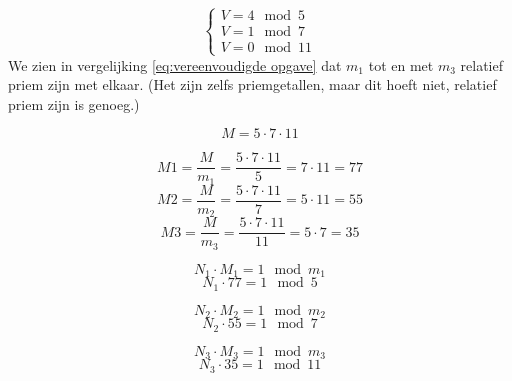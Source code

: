 \documentclass[12pt]{article}
\begin{document}
    \begin{equation} \label{eq:vereenvoudigde opgave}
        \begin{cases}
            V = 4 \mod 5 \\
            V = 1 \mod 7 \\
            V = 0 \mod 11
        \end{cases}
    \end{equation}
    We zien in vergelijking \ref{eq:vereenvoudigde opgave} dat $m_1$ tot en met $m_3$ relatief priem zijn met elkaar. (Het zijn zelfs priemgetallen, maar dit hoeft niet, relatief priem zijn is genoeg.)
    
    \begin{equation}
        M = 5 \cdot 7 \cdot 11
    \end{equation}
    
    \begin{equation}
        M1 = \frac{M}{m_1} = \frac{5 \cdot 7 \cdot 11}{5} = 7 \cdot 11 = 77
    \end{equation}
    \begin{equation}
        M2 = \frac{M}{m_2} = \frac{5 \cdot 7 \cdot 11}{7} = 5 \cdot 11 = 55
    \end{equation}
    \begin{equation}
        M3 = \frac{M}{m_3} = \frac{5 \cdot 7 \cdot 11}{11} = 5 \cdot 7 = 35
    \end{equation}
    
    \begin{equation}
        N_1 \cdot M_1 = 1 \mod m_1
    \end{equation}
    \begin{equation}
        N_1 \cdot 77 = 1 \mod 5
    \end{equation}
    
    \begin{equation}
        N_2 \cdot M_2 = 1 \mod m_2
    \end{equation}
    \begin{equation}
        N_2 \cdot 55 = 1 \mod 7
    \end{equation}
    
    \begin{equation}
        N_3 \cdot M_3 = 1 \mod m_3
    \end{equation}
    \begin{equation}
        N_3 \cdot 35 = 1 \mod 11
    \end{equation}
    
\end{document}
